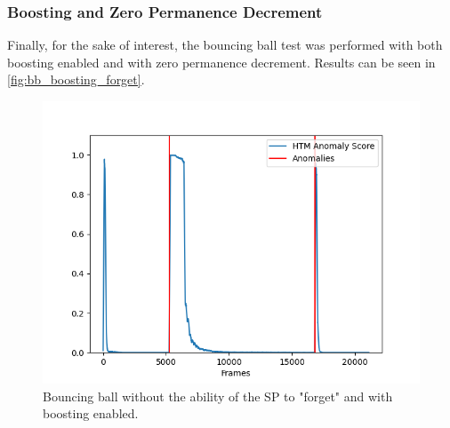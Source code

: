 \subsubsection{Boosting and Zero Permanence Decrement}
Finally, for the sake of interest, the bouncing ball test was performed with both boosting enabled and with zero permanence decrement. Results can be seen in \autoref{fig:bb_boosting_forget}.
\begin{figure}[H]
    \centering
    \includegraphics[width=\textwidth]{resources/experiments/bouncing_ball/bb_anoms_unforgetting_boosting.png}
    \caption{Bouncing ball without the ability of the SP to "forget" and with boosting enabled.}
    \label{fig:bb_boosting_forget}
\end{figure}
